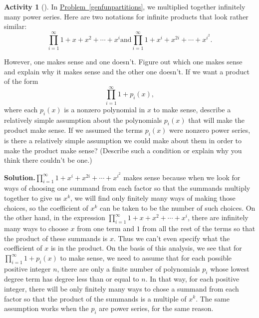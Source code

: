 \documentclass[10pt,]{book}
\theoremstyle{plain}
\theoremstyle{definition}
\newtheorem{activity}[project]{Activity}
\numberwithin{equation}{chapter}
\begin{document}
\begin{activity}[]\label{activity-192}
In \hyperref[genfunpartitions]{Problem~\ref{genfunpartitions}}, we multiplied together infinitely many power series. Here are two notations for infinite products that look rather similar:%
\begin{equation*}
\prod_{i=1}^\infty 1 + x + x^2 +\cdots+ x^i\mbox{and}
\prod_{i=1}^\infty 1 +x^i +x^{2i} +\cdots + x^{i^2}.
\end{equation*}
%
\par
However, one makes sense and one doesn't. Figure out which one makes sense and explain why it makes sense and the other one doesn't. If we want a product of the form%
\begin{equation*}
\prod_{i=1}^\infty 1 +p_i(x),
\end{equation*}
where each \(p_i(x)\) is a nonzero polynomial in \(x\) to make sense, describe a relatively simple assumption about the polynomials \(p_i(x)\) that will make the product make sense. If we assumed the terms \(p_i(x)\) were nonzero power series, is there a relatively simple assumption we could make about them in order to make the product make sense? (Describe such a condition or explain why you think there couldn't be one.)%
\par\medskip\noindent%
\textbf{Solution.}\quad \(\prod_{i=1}^\infty 1 +x^i +x^{2i} +\cdots + x^{i^2}\) makes sense because when we look for ways of choosing one summand from each factor so that the summands multiply together to give us \(x^k\), we will find only finitely many ways of making those choices, so the coefficient of \(x^k\) can be taken to be the number of such choices. On the other hand, in the expression \(\prod_{i=1}^\infty 1 + x + x^2 +\cdots+ x^i\), there are infinitely many ways to choose \(x\) from one term and \(1\) from all the rest of the terms so that the product of these summands is \(x\). Thus we can't even specify what the coefficient of \(x\) is in the product. On the basis of this analysis, we see that for \(\prod_{i=1}^\infty 1 +p_i(x)\) to make sense, we need to assume that for each possible positive integer \(n\), there are only a finite number of polynomials \(p_i\) whose lowest degree term has degree less than or equal to \(n\). In that way, for each positive integer, there will be only finitely many ways to chose a summand from each factor so that the product of the summands is a multiple of \(x^k\). The same assumption works when the \(p_i\) are power series, for the same reason.%
\end{activity}
\end{document}

